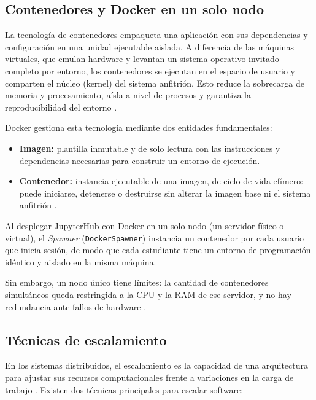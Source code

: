 \subsection{Contenedores y Docker en un solo nodo}
\label{subsec:contenedores_docker}

La tecnología de contenedores empaqueta una aplicación con sus dependencias y configuración en una unidad ejecutable aislada. A diferencia de las máquinas virtuales, que emulan hardware y levantan un sistema operativo invitado completo por entorno, los contenedores se ejecutan en el espacio de usuario y comparten el núcleo (kernel) del sistema anfitrión. Esto reduce la sobrecarga de memoria y procesamiento, aísla a nivel de procesos y garantiza la reproducibilidad del entorno \cite{pahl2017cloud, docker_overview_2024}.

Docker gestiona esta tecnología mediante dos entidades fundamentales:
\begin{itemize}
    \item \textbf{Imagen:} plantilla inmutable y de solo lectura con las instrucciones y dependencias necesarias para construir un entorno de ejecución.
    \item \textbf{Contenedor:} instancia ejecutable de una imagen, de ciclo de vida efímero: puede iniciarse, detenerse o destruirse sin alterar la imagen base ni el sistema anfitrión \cite{docker_overview_2024}.
\end{itemize}

Al desplegar JupyterHub con Docker en un solo nodo (un servidor físico o virtual), el \textit{Spawner} (\texttt{DockerSpawner}) instancia un contenedor por cada usuario que inicia sesión, de modo que cada estudiante tiene un entorno de programación idéntico y aislado en la misma máquina.

Sin embargo, un nodo único tiene límites: la cantidad de contenedores simultáneos queda restringida a la CPU y la RAM de ese servidor, y no hay redundancia ante fallos de hardware \cite{pahl2017cloud}.

\subsection{Técnicas de escalamiento}
\label{subsec:escalamiento}

En los sistemas distribuidos, el escalamiento es la capacidad de una arquitectura para ajustar sus recursos computacionales frente a variaciones en la carga de trabajo \cite{vansteen2023distributed}. Existen dos técnicas principales para escalar software:

